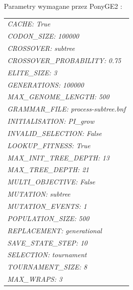 Parametry wymagane przez PonyGE2 \cite{PonyGE2-wiki}:
\begin{center}
\begin{tabular}{l}
\textit{CACHE:                         True} \\
\textit{CODON\_SIZE:                   100000} \\
\textit{CROSSOVER:                     subtree} \\
\textit{CROSSOVER\_PROBABILITY:         0.75} \\
\textit{ELITE\_SIZE:                   3} \\
\textit{GENERATIONS:                   100000} \\
\textit{MAX\_GENOME\_LENGTH:           500} \\
\textit{GRAMMAR\_FILE:                  process-subtree.bnf} \\
\textit{INITIALISATION:                 PI\_grow} \\
\textit{INVALID\_SELECTION:              False} \\
\textit{LOOKUP\_FITNESS:                 True} \\
\textit{MAX\_INIT\_TREE\_DEPTH:            13} \\
\textit{MAX\_TREE\_DEPTH:                 21} \\
\textit{MULTI\_OBJECTIVE:                False} \\
\textit{MUTATION:                       subtree} \\
\textit{MUTATION\_EVENTS:                1} \\
\textit{POPULATION\_SIZE:                500} \\
\textit{REPLACEMENT:                    generational} \\
\textit{SAVE\_STATE\_STEP:                10} \\
\textit{SELECTION:                      tournament} \\
\textit{TOURNAMENT\_SIZE:                8} \\
\textit{MAX\_WRAPS:                      3}
\end{tabular}
\end{center}

